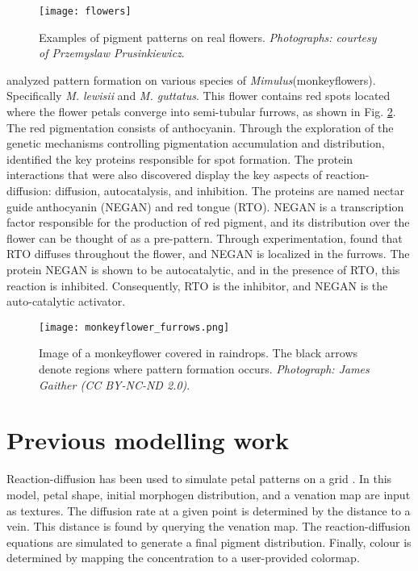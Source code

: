 \begin{figure}[!ht]
	\centering
	\texttt{[image: flowers]}
	\caption[Examples of pigment patterns on real flowers]{Examples of pigment patterns on real flowers. \textit{Photographs: courtesy of Przemyslaw Prusinkiewicz}.}
	\label{fig:realFlowers}
\end{figure}

\citet{Yuan2019} analyzed pattern formation on various species of \textit{Mimulus}(monkeyflowers). Specifically \textit{M. lewisii} and \textit{M. guttatus}. This flower contains red spots located where the flower petals converge into semi-tubular furrows, as shown in Fig. \ref{fig:monkeyflower_real}. The red pigmentation consists of anthocyanin. Through the exploration of the genetic mechanisms controlling pigmentation accumulation and distribution, \citet{Yuan2019} identified the key proteins responsible for spot formation. The protein interactions that were also discovered display the key aspects of reaction-diffusion: diffusion, autocatalysis, and inhibition. The proteins are named nectar guide anthocyanin (NEGAN) and red tongue (RTO). NEGAN is a transcription factor responsible for the production of red pigment, and its distribution over the flower can be thought of as a pre-pattern. Through experimentation, \citet{Yuan2019} found that RTO diffuses throughout the flower, and NEGAN is localized in the furrows. The protein NEGAN is shown to be autocatalytic, and in the presence of RTO, this reaction is inhibited. Consequently, RTO is the inhibitor, and NEGAN is the auto-catalytic activator.

\begin{figure}[ht]
	\centering
	\texttt{[image: monkeyflower\_furrows.png]}
	\caption[Image of a monkeyflower covered in raindrops]{Image of a monkeyflower covered in raindrops. The black arrows denote regions where pattern formation occurs. \textit{Photograph: James Gaither (CC BY-NC-ND 2.0)}.}
	\label{fig:monkeyflower_real}
\end{figure}

\section{Previous modelling work}
Reaction-diffusion has been used to simulate petal patterns on a grid \citep{zhou2007}. In this model, petal shape, initial morphogen distribution, and a venation map are input as textures. The diffusion rate at a given point is determined by the distance to a vein. This distance is found by querying the venation map. The reaction-diffusion equations are simulated to generate a final pigment distribution. Finally, colour is determined by mapping the concentration to a user-provided colormap. %

